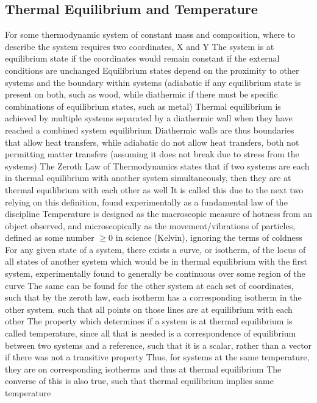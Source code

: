 \documentclass[11 pt, twoside]{article}
\newenvironment{outline*}
{
	\begin{outline}[enumerate]
	}
	{\end{outline}
}
\begin{document}
\subsection{Thermal Equilibrium and Temperature}
\begin{outline*}
\1 For some thermodynamic system of constant mass and composition, where to describe the system requires two coordinates, X and Y
\2 The system is at equilibrium state if the coordinates would remain constant if the external conditions are unchanged
\2 Equilibrium states depend on the proximity to other systems and the boundary within systems (adiabatic if any equilibrium state is present on both, such as wood, while diathermic if there must be specific combinations of equilibrium states, such as metal)
\3 Thermal equilibrium is achieved by multiple systems separated by a diathermic wall when they have reached a combined system equilibrium
\3 Diathermic walls are thus boundaries that allow heat transfers, while adiabatic do not allow heat transfers, both not permitting matter transfers (assuming it does not break due to stress from the systems)
\2 The Zeroth Law of Thermodynamics states that if two systems are each in thermal equilibrium with another system simultaneously, then they are at thermal equilibrium with each other as well
\3 It is called this due to the next two relying on this definition, found experimentally as a fundamental law of the discipline
\1 Temperature is designed as the macroscopic measure of hotness from an object observed, and microscopically as the movement/vibrations of particles, defined as some number $\geq 0$ in science (Kelvin), ignoring the terms of coldness
\2 For any given state of a system, there exists a curve, or isotherm, of the locus of all states of another system which would be in thermal equilibrium with the first system, experimentally found to generally be continuous over some region of the curve
\3 The same can be found for the other system at each set of coordinates, such that by the zeroth law, each isotherm has a corresponding isotherm in the other system, such that all points on those lines are at equilibrium with each other
\3 The property which determines if a system is at thermal equilibrium is called temperature, since all that is needed is a correspondence of equilibrium between two systems and a reference, such that it is a scalar, rather than a vector if there was not a transitive property
\2 Thus, for systems at the same temperature, they are on corresponding isotherms and thus at thermal equilibrium
\3 The converse of this is also true, such that thermal equilibrium implies same temperature

\end{outline*}
\end{document}
